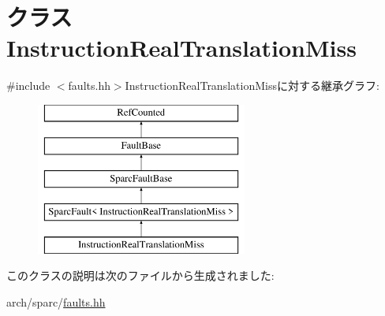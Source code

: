 \hypertarget{classSparcISA_1_1InstructionRealTranslationMiss}{
\section{クラス InstructionRealTranslationMiss}
\label{classSparcISA_1_1InstructionRealTranslationMiss}
}


{\ttfamily \#include $<$faults.hh$>$}InstructionRealTranslationMissに対する継承グラフ:\begin{figure}[H]
\begin{center}
\leavevmode
\includegraphics[height=5cm]{classSparcISA_1_1InstructionRealTranslationMiss}
\end{center}
\end{figure}


このクラスの説明は次のファイルから生成されました:\begin{DoxyCompactItemize}
\item 
arch/sparc/\hyperlink{arch_2sparc_2faults_8hh}{faults.hh}\end{DoxyCompactItemize}
